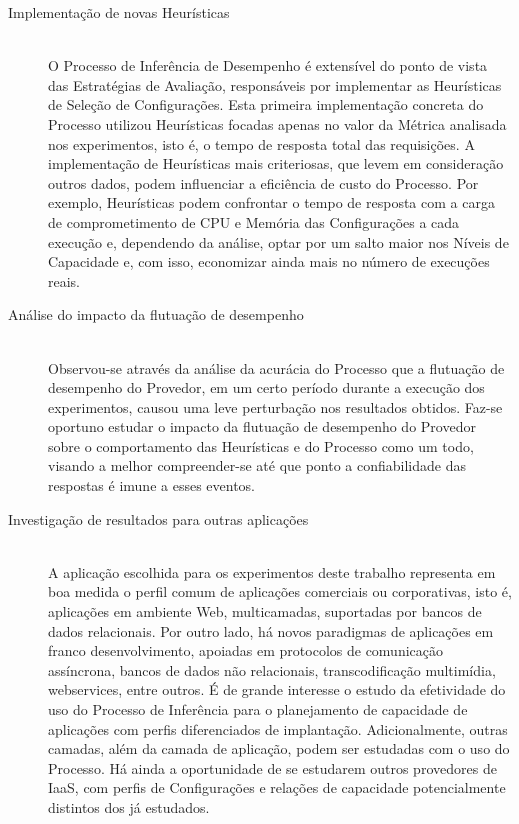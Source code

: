\begin{description}
\item[Implementação de novas Heurísticas] \hfill \\
O Processo de Inferência de Desempenho é extensível do ponto de vista das
Estratégias de Avaliação, responsáveis por implementar as Heurísticas de Seleção
de Configurações. Esta primeira implementação concreta do Processo utilizou 
Heurísticas focadas apenas no valor da Métrica analisada nos experimentos, isto é,
o tempo de resposta total das requisições. A implementação de Heurísticas mais
criteriosas, que levem em consideração outros dados, podem influenciar a eficiência
de custo do Processo. Por exemplo, Heurísticas podem confrontar o tempo de resposta
com a carga de comprometimento de CPU e Memória das Configurações a cada execução
e, dependendo da análise, optar por um salto maior nos Níveis de Capacidade e, 
com isso, economizar ainda mais no número de execuções reais. 

\item[Análise do impacto da flutuação de desempenho] \hfill \\
Observou-se através da análise da acurácia do Processo que a flutuação de 
desempenho do Provedor, em um certo período durante a execução dos experimentos,
causou uma leve perturbação nos resultados obtidos. Faz-se oportuno estudar o 
impacto da flutuação de desempenho do Provedor sobre o comportamento das Heurísticas
e do Processo como um todo, visando a melhor compreender-se até que ponto a 
confiabilidade das respostas é imune a esses eventos.
 
\item[Investigação de resultados para outras aplicações] \hfill \\
A aplicação escolhida para os experimentos deste trabalho representa em boa
medida o perfil comum de aplicações comerciais ou corporativas, isto é, aplicações
em ambiente Web, multicamadas, suportadas por bancos de dados relacionais. Por
outro lado, há novos paradigmas de aplicações em franco desenvolvimento, apoiadas
em protocolos de comunicação assíncrona, bancos de dados não relacionais, 
transcodificação multimídia, webservices, entre outros. É de grande interesse
o estudo da efetividade do uso do Processo de Inferência para o planejamento de
capacidade de aplicações com perfis diferenciados de implantação. Adicionalmente,
outras camadas, além da camada de aplicação, podem ser estudadas com o uso do
Processo. Há ainda a oportunidade de se estudarem outros provedores de IaaS, com
perfis de Configurações e relações de capacidade potencialmente distintos dos já
estudados.


\end{description}
